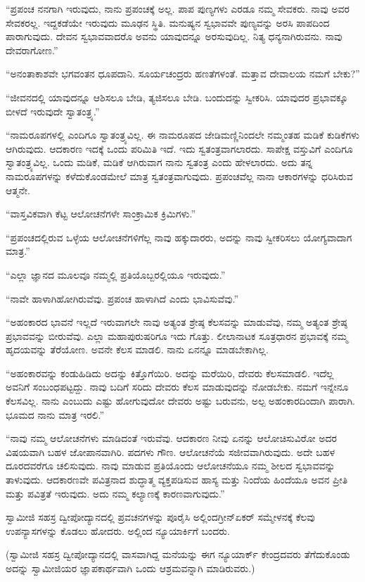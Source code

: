  “ಪ್ರಪಂಚ ನನಗಾಗಿ ಇರುವುದು, ನಾನು ಪ್ರಪಂಚಕ್ಕೆ ಅಲ್ಲ. ಪಾಪ ಪುಣ್ಯಗಳು ಎರಡೂ ನಮ್ಮ ಸೇವಕರು. ನಾವು ಅವರ ಸೇವಕರಲ್ಲ. ಇದ್ದಕಡೆಯೇ ಇರುವುದು ಮೂಢನ ಸ್ಥಿತಿ. ಮನುಷ್ಯನ ಸ್ವಭಾವವೇ ಪುಣ್ಯವನ್ನು ಅರಸಿ ಪಾಪದಿಂದ ಪಾರಾಗುವುದು. ದೇವನ ಸ್ವಭಾವವಾದರೊ ಅವನು ಯಾವುದನ್ನೂ ಅರಸುವುದಿಲ್ಲ. ನಿತ್ಯ ಧನ್ಯನಾಗಿರುವನು. ನಾವು ದೇವರಾಗೋಣ.” 

\newpage

 “ಅನಂತಾಕಾಶವೇ ಭಗವಂತನ ಧೂಪದಾನಿ. ಸೂರ್ಯಚಂದ್ರರು ಹಣತೆಗಳಂತೆ. ಮತ್ತಾವ ದೇವಾಲಯ ನಮಗೆ ಬೇಕು?” 

 “ಜೀವನದಲ್ಲಿ ಯಾವುದನ್ನೂ ಆಶಿಸಲೂ ಬೇಡಿ, ತ್ಯಜಿಸಲೂ ಬೇಡಿ. ಬಂದುದನ್ನು ಸ್ವೀಕರಿಸಿ. ಯಾವುದರ ಪ್ರಭಾವಕ್ಕೂ ಬೀಳದೆ ಇರುವುದೇ ಸ್ವಾತಂತ್ರ್ಯ.” 

 “ನಾಮರೂಪಗಳಲ್ಲಿ ಎಂದಿಗೂ ಸ್ವಾತಂತ್ರ್ಯವಿಲ್ಲ. ಈ ನಾಮರೂಪದ ಜೇಡಿಮಣ್ಣಿನಿಂದಲೇ ನಮ್ಮಂತಹ ಮಡಿಕೆ ಕುಡಿಕೆಗಳು ಆಗಿರುವುದು. ಆದಕಾರಣ ಇದಕ್ಕೆ ಒಂದು ಪರಿಮಿತಿ ಇದೆ. ಇದು ಸ್ವತಂತ್ರವಾಗಲಾರದು. ಸಾಪೇಕ್ಷ ವಸ್ತುವಿಗೆ ಎಂದಿಗೂ ಸ್ವಾತಂತ್ರ್ಯವಿಲ್ಲ. ಒಂದು ಮಡಿಕೆ, ಮಡಿಕೆ ಆಗಿರುವಾಗ ನಾನು ಸ್ವತಂತ್ರ ಎಂದು ಹೇಳಲಾರದು. ಅದು ತನ್ನ ನಾಮರೂಪಗಳನ್ನು ಕಳೆದುಕೊಂಡಮೇಲೆ ಮಾತ್ರ ಸ್ವತಂತ್ರವಾಗುವುದು. ಪ್ರಪಂಚವೆಲ್ಲ ನಾನಾ ಆಕಾರಗಳನ್ನು ಧರಿಸಿರುವ ಆತ್ಮನೇ. 

 “ವಾಸ್ತವಿಕವಾಗಿ ಕೆಟ್ಟ ಆಲೋಚನೆಗಳೇ ಸಾಂಕ್ರಾಮಿಕ ಕ್ರಿಮಿಗಳು.” 

 “ಪ್ರಪಂಚದಲ್ಲಿರುವ ಒಳ್ಳೆಯ ಆಲೋಚನೆಗಳಿಗೆಲ್ಲ ನಾವು ಹಕ್ಕುದಾರರು, ಅದನ್ನು ನಾವು ಸ್ವೀಕರಿಸಲು ಯೋಗ್ಯವಾದಾಗ ಮಾತ್ರ.” 

 “ಎಲ್ಲಾ ಜ್ಞಾನದ ಮೂಲವೂ ನಮ್ಮಲ್ಲಿ ಪ್ರತಿಯೊಬ್ಬರಲ್ಲಿಯೂ ಇರುವುದು.” 

 “ನಾವೇ ಹಾಳಾಗಿಹೋಗಿರುವೆವು. ಪ್ರಪಂಚ ಹಾಳಾಗಿದೆ ಎಂದು ಭಾವಿಸುವೆವು.” 

 “ಅಹಂಕಾರದ ಭಾವನೆ ಇಲ್ಲದೆ ಇರುವಾಗಲೇ ನಾವು ಅತ್ಯಂತ ಶ್ರೇಷ್ಠ ಕೆಲಸವನ್ನು ಮಾಡುವೆವು, ನಮ್ಮ ಅತ್ಯಂತ ಶ್ರೇಷ್ಠ ಪ್ರಭಾವವನ್ನು ಬೀರುವೆವು. ಎಲ್ಲಾ ಮಹಾಪುರುಷರಿಗೂ ಇದು ಗೊತ್ತು. ಲೀಲಾನಾಟಕ ಸೂತ್ರಧಾರನ ಪ್ರಭಾವಕ್ಕೆ ನಮ್ಮ ಹೃದಯವನ್ನು ತೆರೆಯೋಣ. ಅವನೇ ಕೆಲಸ ಮಾಡಲಿ. ನಾನು ಏನನ್ನೂ ಮಾಡಬೇಕಾಗಿಲ್ಲ. 

 “ಅಹಂಕಾರವನ್ನು ಕಂಡುಹಿಡಿದು ಅದನ್ನು ಕಿತ್ತೊಗೆಯಿರಿ. ಅದನ್ನು ಮರೆಯಿರಿ, ದೇವರು ಕೆಲಸಮಾಡಲಿ. ಇದೆಲ್ಲ ಅವನಿಗೆ ಸಂಬಂಧಪಟ್ಟದ್ದು. ನಾವು ಬದಿಗೆ ಸರಿದು ದೇವರು ಕೆಲಸ ಮಾಡುವುದನ್ನು ನೋಡಬೇಕು. ನಮಗೆ ಇನ್ನೇನೂ ಕೆಲಸವಿಲ್ಲ. ನಾನು ಎಂಬುದು ಎಷ್ಟು ಹೋಗುವುದೋ ದೇವರು ಅಷ್ಟು ಬರುವನು, ಅಲ್ಪ ಅಹಂಕಾರದಿಂದಾಗಿ ಪಾರಾಗಿ. ಭೂಮದ ನಾನು ಮಾತ್ರ ಇರಲಿ.” 

 “ನಾವು ನಮ್ಮ ಆಲೋಚನೆಗಳು ಮಾಡಿದಂತೆ ಇರುವೆವು. ಆದಕಾರಣ ನೀವು ಏನನ್ನು ಆಲೋಚಿಸುವಿರೋ ಅದರ ವಿಷಯವಾಗಿ ಬಹಳ ಜೋಪಾನವಾಗಿರಿ. ಪದಗಳು ಗೌಣ. ಆಲೋಚನೆಯೆ ಸಜೀವವಾಗಿರುವುದು. ಅದೇ ಬಹಳ ದೂರದವರೆಗೂ ಚಲಿಸುವುದು. ನಾವು ಮಾಡುವ ಪ್ರತಿಯೊಂದು ಆಲೋಚನೆಯೂ ನಮ್ಮ ಶೀಲದ ಸ್ವಭಾವವನ್ನು ತಾಳುವುದು. ಆದಕಾರಣವೇ ಪವಿತ್ರನಾದ ಶುದ್ಧಾತ್ಮ ವ್ಯಕ್ತಪಡಿಸುವ ಹಾಸ್ಯ ಮತ್ತು ನಿಂದೆಯ ಹಿಂದೆಯೂ ಅವನ ಪ್ರೀತಿ ಮತ್ತು ಪವಿತ್ರತೆ ಇರುವುದು. ಅದು ನಮ್ಮ ಕಲ್ಯಾಣಕ್ಕೆ ಕಾರಣವಾಗುವುದು.” 

\delimiter

\vskip -5pt

 ಸ್ವಾಮೀಜಿ ಸಹಸ್ರ ದ್ವೀಪೋದ್ಯಾನದಲ್ಲಿ ಪ್ರವಚನಗಳನ್ನು ಪೂರೈಸಿ ಅಲ್ಲಿಂದ\break ಗ್ರೀನ್‍ಏಕರ್ ಸಮ್ಮೇಳನಕ್ಕೆ ಕೆಲವು ಉಪನ್ಯಾಸಗಳನ್ನು ಕೊಡಲು ಹೋದರು. ಅಲ್ಲಿಂದ ನ್ಯೂಯಾರ್ಕಿಗೆ ಬಂದರು. 

 (ಸ್ವಾಮೀಜಿ ಸಹಸ್ರ ದ್ವೀಪೋದ್ಯಾನದಲ್ಲಿ ವಾಸವಾಗಿದ್ದ ಮನೆಯನ್ನು ಈಗ ನ್ಯೂಯಾರ್ಕ್ ಕೇಂದ್ರದವರು ತೆಗೆದುಕೊಂಡು ಅದನ್ನು ಸ್ವಾಮೀಜಿಯರ ಜ್ಞಾಪಕಾರ್ಥವಾಗಿ ಒಂದು ಆಶ್ರಮವನ್ನಾಗಿ ಮಾಡಿರುವರು.) 

